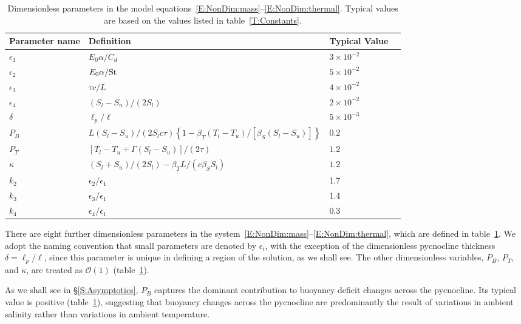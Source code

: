 \documentclass[openacc]{rsproca_new}%
\newcommand{\order}[1]{\mathcal{O}(#1)}
\newcommand{\blue}[1]{{\color{blue} #1}}
\renewcommand{\blue}[1]{{\textcolor{black}{#1}}} %
\newcommand{\epsone}{\epsilon_{1}} %
\newcommand{\epstwo}{\epsilon_{2}} %
\newcommand{\epsthree}{\epsilon_{3}} %
\newcommand{\epsfour}{\epsilon_{4}}
\newcommand{\Pb}{\textit{P}_B}  %
\newcommand{\lt}{\delta} %
\newcommand{\Pt}{\textit{P}_T}
\begin{document}
\begin{table}[!h]
\caption{Dimensionless parameters in the model equations~\eqref{E:NonDim:mass}--\eqref{E:NonDim:thermal}. Typical values are based on the values listed in table~\ref{T:Constants}.}\label{T:Dimensionless_Parameters}
\begin{center}
\begin{tabular}{llll}
Parameter name  & Definition   & Typical Value \\
\hline 
\vspace{2pt}
$\epsone$ & $  E_0 \alpha /C_d $  &$ 3 \times 10^{-2}$ \\
$\epstwo$ & $  E_0 \alpha \blue{/}\mathrm{St} $ & $ 5 \times 10^{-2}$ \\
$\epsthree$ & $  \tau c / L $ & $ 4 \times 10^{-2}$ \\
$\epsfour$ & $  (S_l - S_u)/(2 S_l) $  &$ 2 \times 10^{-2}$ \\
$\lt$ & $  \ell_p / \ell $ & $  5 \times 10^{-3}$ \\
$\Pb$ & $  L (S_l - S_u)/(2S_l c \tau)\left\{1 - \beta_T (T_l - T_u)/\left[\beta_S (S_l - S_u)\right]\right\}$   & $  0.2$ \\
$\Pt$ & $ \left[T_l - T_u + \Gamma( S_l - S_u)\right]/(2 \tau)$ & $  1.2$ \\
$\kappa$ & $ (S_l + S_u)/(2S_l) -  \beta_T L / (c \beta_S S_l)$ &  $  1.2$ \\
\hline
$k_2$ & $\epstwo/\epsone$ & 1.7\\
$k_3$ & $\epsthree / \epsone$ & 1.4\\
$k_4$ & $\epsfour/ \epsone$ & 0.3\\
\end{tabular}
\end{center}
\end{table}
 
There are eight further dimensionless parameters in the system~\eqref{E:NonDim:mass}--\eqref{E:NonDim:thermal}, which are defined in table~\ref{T:Dimensionless_Parameters}. We adopt the naming convention that small parameters are denoted by $\epsilon_i$, with the exception of the dimensionless pycnocline thickness $\delta = \ell_p / \ell$, since this parameter is unique in defining a region of the solution, as we shall see. The other dimensionless variables, $\Pb$, $\Pt$, and $\kappa$, are treated as $\order{1}$ (table~\ref{T:Dimensionless_Parameters}).

As we shall see in \S\ref{S:Asymptotics}, $\Pb$ captures the dominant contribution to buoyancy deficit changes across the pycnocline. Its typical value is positive (table~\ref{T:Dimensionless_Parameters}), suggesting that buoyancy changes across the pycnocline are predominantly the result of variations in ambient salinity rather than variations in ambient temperature.
\end{document}
